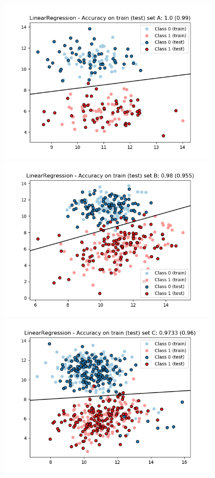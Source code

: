 \documentclass[a4paper, 11pt]{article}
\begin{document}
\begin{enumerate}[label=\alph*]
        \begin{figure}[!htb]
          \includegraphics[width=\linewidth]{./images/LinReg_A.png}
          \label{fig:linreg_a}
        \endminipage\hfill
          \includegraphics[width=\linewidth]{./images/LinReg_B.png}
          \label{fig:linreg_b}
        \endminipage\hfill
          \includegraphics[width=\linewidth]{./images/LinReg_C.png}

\end{figure}
\end{enumerate}
\end{document}
